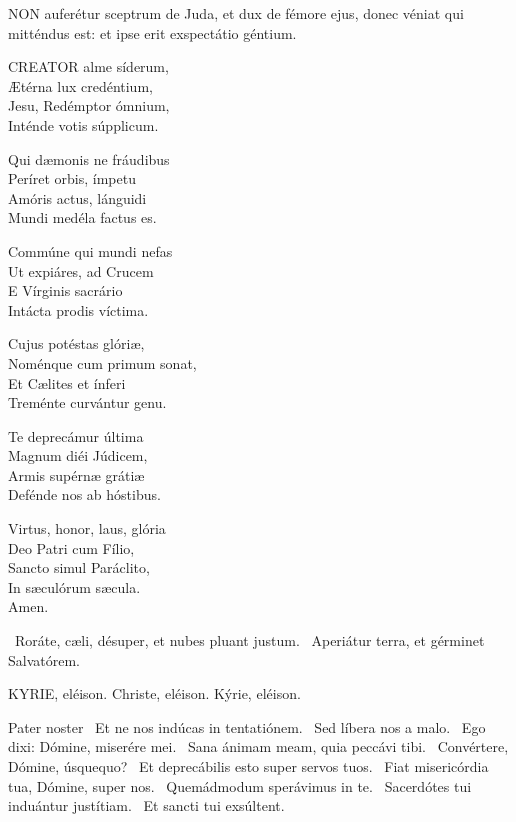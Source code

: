 
\lettrine[lines=2]{N}{ON} auferétur sceptrum de Juda, et dux de fémore ejus, donec véniat qui mitténdus est: et ipse erit exspectátio géntium.


\lettrine[lines=2]{C}{REATOR} alme síderum,\\
Ætérna lux credéntium,\\
Jesu, Redémptor ómnium,\\
Inténde votis súpplicum.

Qui dæmonis ne fráudibus\\
Períret orbis, ímpetu\\
Amóris actus, lánguidi\\
Mundi medéla factus es.

Commúne qui mundi nefas\\
Ut expiáres, ad Crucem\\
E Vírginis sacrário\\
Intácta prodis víctima.

Cujus potéstas glóriæ,\\
Noménque cum primum sonat,\\
Et Cælites et ínferi\\
Treménte curvántur genu.

Te deprecámur última\\
Magnum diéi Júdicem,\\
Armis supérnæ grátiæ\\
Defénde nos ab hóstibus.

Virtus, honor, laus, glória\\
Deo Patri cum Fílio,\\
Sancto simul Paráclito,\\
In sæculórum sæcula.\\
Amen.

\V\ Roráte, cæli, désuper, et nubes pluant justum. \R\ Aperiátur terra, et gérminet Salvatórem.



\label{feria3:precesferialesvesperas}

KYRIE, eléison. Christe, eléison. Kýrie, eléison.

Pater noster  \V\ Et ne nos indúcas in tentatiónem. \R\ Sed líbera nos a malo. \V\ Ego dixi: Dómine, miserére mei. \R\ Sana ánimam meam, quia peccávi tibi. \V\ Convértere, Dómine, úsquequo? \R\ Et deprecábilis esto super servos tuos. \V\ Fiat misericórdia tua, Dómine, super nos. \R\ Quemádmodum sperávimus in te. \V\ Sacerdótes tui induántur justítiam. \R\ Et sancti tui exsúltent.

